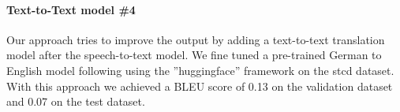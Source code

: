 \paragraph{Text-to-Text model \#4} Our  approach tries to improve the output by adding a text-to-text translation model after the speech-to-text model. We fine tuned a pre-trained German to
English model following  using the ''huggingface'' framework \cite{wolf-etal-2020-transformers} on the \gls{stcd} dataset. With this approach we achieved a BLEU score of 0.13 on the validation dataset and
0.07 on the test dataset.
